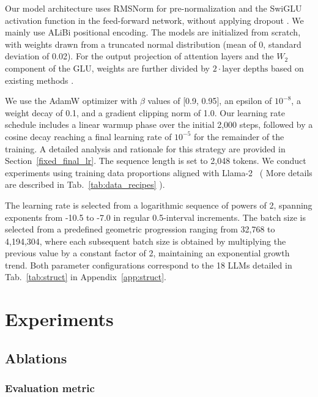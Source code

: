 \documentclass[11pt]{article}
\begin{document}
    Our model architecture uses RMSNorm \cite{Zhang2019} for pre-normalization and the SwiGLU \cite{Shazeer2020}
    activation function in the feed-forward network, without applying dropout \cite{JMLR:v15:srivastava14a}.
    We mainly use ALiBi \cite{Press2021} positional encoding. The models are initialized from scratch,
    with weights drawn from a truncated normal distribution (mean of 0, standard
    deviation of 0.02). For the output projection of attention layers and the
    $W_{2}$ component of the GLU, weights are further divided by $2 \cdot \text{layer
    depths}$ based on existing methods \cite{Touvron2023a,Touvron2023b,Grattafiori2024,DeepSeek-AI2024,Yang2024,DeepSeek-AI2024b,DeepSeek-AI2025,wang2019automatic,yuan2022unified}.

    We use the AdamW \cite{Loshchilov2017} optimizer with $\beta$ values of [0.9, 0.95], an epsilon of
    $10^{-8}$, a weight decay of 0.1, and a gradient clipping norm of 1.0. Our learning rate schedule includes a linear warmup phase over the initial 2,000 steps, followed by a cosine decay reaching a final learning rate of $10^{-5}$ for the remainder of the training. A detailed analysis and rationale for this strategy are provided in Section~\ref{fixed_final_lr}. The sequence length is set to 2,048 tokens. We conduct experiments using training data proportions aligned with Llama-2~ \cite{Touvron2023b} ( More details are described in Tab.~\ref{tab:data_recipes} ).

    The learning rate is selected from a logarithmic sequence of powers of 2, spanning exponents from -10.5 to -7.0 in regular 0.5-interval increments.
    The batch size is selected from a predefined geometric progression ranging from 32,768 to 4,194,304, where each subsequent batch size is obtained by multiplying the previous value by a constant factor of 2, maintaining an exponential growth trend. Both parameter configurations correspond to the 18 LLMs detailed in Tab.~\ref{tab:struct} in Appendix~\ref{app:struct}.

    \section{Experiments}


    \subsection{Ablations}

    \subsubsection{Evaluation metric}
    \label{Evaluation metric}
\end{document}
